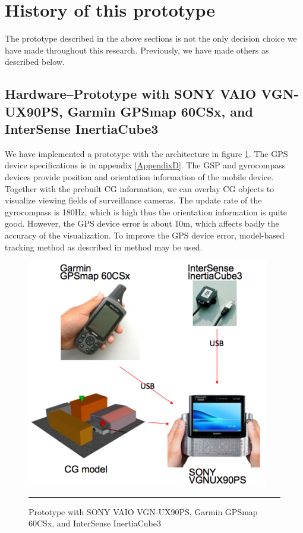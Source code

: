 \section{History of this prototype}

The prototype described in the above sections is not the only decision choice we have made throughout this research. Previously, we have made others as described below.

\subsection{Hardware--Prototype with SONY VAIO VGN-UX90PS, Garmin GPSmap 60CSx, and InterSense InertiaCube3}

We have implemented a prototype with the architecture in figure \ref{fig:VAIOGPSGyro}. The GPS device specifications is in appendix \ref{AppendixD}. The GSP and gyrocompass devices provide position and orientation information of the mobile device. Together with the prebuilt CG information, we can overlay CG objects to visualize viewing fields of surveillance cameras. The update rate of the gyrocompass is 180Hz, which is high thus the orientation information is quite good. However, the GPS device error is about 10m, which affects badly the accuracy of the visualization. To improve the GPS device error, model-based tracking method as described in \citep{Reference13} method may be used.

\begin{figure}[htbp]
	\centering
	\includegraphics{./Primitives/vaio_gps_gyro.png}
	\rule{35em}{0.5pt}
	\caption[Prototype with SONY VAIO VGN-UX90PS, Garmin GPSmap 60CSx, and InterSense InertiaCube3]{Prototype with SONY VAIO VGN-UX90PS, Garmin GPSmap 60CSx, and InterSense InertiaCube3}
	\label{fig:VAIOGPSGyro}
\end{figure}

